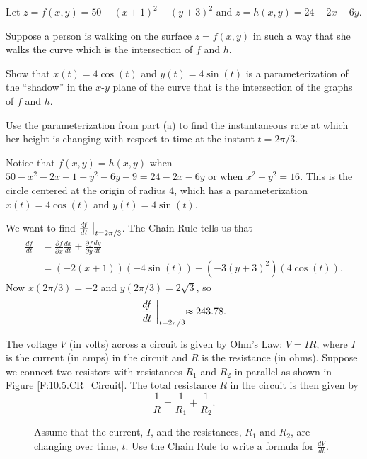 \begin{exercises}
\item Let $z = f(x,y) = 50 - (x+1)^2 - (y+3)^2$ and $z = h(x,y) = 24 - 2x - 6y$.

Suppose a person is walking on the surface $z = f(x,y)$ in such a way that she walks the curve which is the intersection of $f$ and $h$. 
	\ba
	\item Show that $x(t) = 4 \cos(t)$ and $y(t) = 4 \sin(t)$ is a parameterization of the ``shadow'' in the $x$-$y$ plane of the curve that is the intersection of the graphs of $f$ and $h$.

	\item Use the parameterization from part (a) to find the instantaneous rate at which her height is changing with respect to time at the instant $t = 2\pi/3$.  
	
	\ea

\begin{exerciseSolution}
	\ba
	\item Notice that $f(x,y) = h(x,y)$ when $50-x^2-2x-1-y^2-6y-9=24-2x-6y$ or when $x^2+y^2=16$. This is the circle centered at the origin of radius 4, which has a parameterization $x(t) = 4 \cos(t)$ and $y(t) = 4 \sin(t)$.  

	\item We want to find $\frac{df}{dt}\bigm|_{t=2\pi/3}$. The Chain Rule tells us that 
\begin{align*}
\frac{df}{dt} &= \frac{\partial f}{\partial x} \frac{dx}{dt} + \frac{\partial f}{\partial y} \frac{dy}{dt} \\
	&= (-2(x+1))(-4\sin(t)) + (-3(y+3)^2)(4\cos(t)).
\end{align*}
Now $x(2\pi/3) = -2$ and $y(2\pi/3) = 2\sqrt{3}$, so 
\[\frac{df}{dt}\biggm|_{t=2\pi/3} \approx 243.78.\]

	\ea

\end{exerciseSolution}

\item The voltage $V$ (in volts) across a circuit is given by Ohm's Law: $V = IR$, where $I$ is the current (in amps) in the circuit and $R$ is the resistance (in ohms). Suppose we connect two resistors with resistances $R_1$ and $R_2$ in parallel as shown in Figure \ref{F:10.5.CR_Circuit}. The total resistance $R$ in the circuit is then given by
\[\frac{1}{R} = \frac{1}{R_1} + \frac{1}{R_2}.\]
\begin{figure}[ht]
\begin{minipage}{4in}
        \ba
    \item Assume that the current, $I$, and the resistances, $R_1$ and $R_2$, are changing over time, $t$. Use the Chain Rule to write a formula for $\frac{dV}{dt}$.




\end{minipage}
\end{figure}
\end{exercises}
